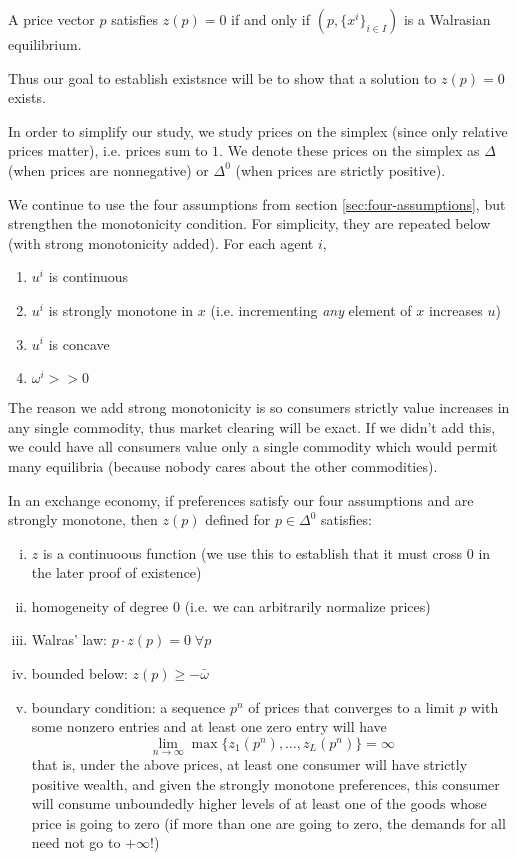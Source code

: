 \begin{prop}
  A price vector $p$ satisfies $z(p) = 0$ if and only if $(p,
  \{x^i\}_{i \in I})$ is a Walrasian equilibrium.
\end{prop}

Thus our goal to establish existsnce will be to show that a solution
to $z(p) = 0$ exists.

In order to simplify our study, we study prices on the simplex (since
only relative prices matter), i.e. prices sum to $1$. We denote these
prices on the simplex as $\Delta$ (when prices are nonnegative) or
$\Delta^0$ (when prices are strictly positive).


We continue to use the four assumptions from section
\ref{sec:four-assumptions}, but strengthen the monotonicity
condition. For simplicity, they are repeated below (with strong
monotonicity added). For each agent $i$,
\begin{enumerate}
\item $u^i$ is continuous
\item $u^i$ is strongly monotone in $x$ (i.e. incrementing
  \textit{any} element of $x$ increases $u$)
\item $u^i$ is concave
\item $\omega^i >> 0$
\end{enumerate}

The reason we add strong monotonicity is so consumers strictly value
increases in any single commodity, thus market clearing will be
exact. If we didn't add this, we could have all consumers value only a
single commodity which would permit many equilibria (because nobody
cares about the other commodities).

\begin{prop}
  In an exchange economy, if preferences satisfy our four assumptions
  and are strongly monotone, then $z(p)$ defined for $p \in \Delta^0$
  satisfies:
  \begin{enumerate}[(i)]
  \item $z$ is a continuoous function (we use this to establish that
    it must cross $0$ in the later proof of existence)
  \item homogeneity of degree $0$ (i.e. we can arbitrarily normalize
    prices)
  \item Walras' law: $p \cdot z(p) = 0 \; \forall p$
  \item bounded below: $z(p) \geq - \bar \omega$
  \item boundary condition: a sequence $p^n$ of prices that converges
    to a limit $p$ with some nonzero entries and at least one zero
    entry will have
    \[
    \lim_{n \to \infty} \max\{ z_1(p^n), \dots, z_L(p^n)\} = \infty
    \]
    that is, under the above prices, at least one consumer will have
    strictly positive wealth, and given the strongly monotone
    preferences, this consumer will consume unboundedly higher levels
    of at least one of the goods whose price is going to zero (if more
    than one are going to zero, the demands for all need not go to
    $+\infty$!)
  \end{enumerate}

\end{prop}

